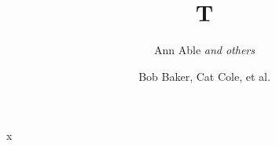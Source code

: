 \documentclass{article}
\begin{document}
\title{T}
\author{Ann Able \emph{and others} \and Bob Baker, Cat Cole, et al.}
\maketitle
x
\end{document}
